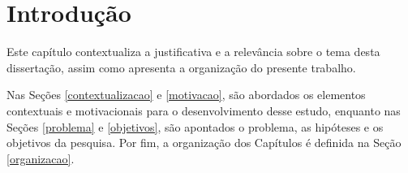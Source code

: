 \chapter{Introdução}
\label{chap:intro}

Este capítulo contextualiza a justificativa e a relevância sobre o tema desta dissertação, assim como apresenta a organização do presente trabalho. 

Nas Seções \ref{contextualizacao} e \ref{motivacao}, são abordados os elementos contextuais e motivacionais para o desenvolvimento desse estudo, enquanto nas Seções \ref{problema} e \ref{objetivos}, são apontados o problema, as hipóteses e os objetivos da pesquisa. Por fim, a organização dos Capítulos é definida na Seção \ref{organizacao}.

 

  
  
  
 
 
      
 

 
% 
 
% 

%

%

%  
